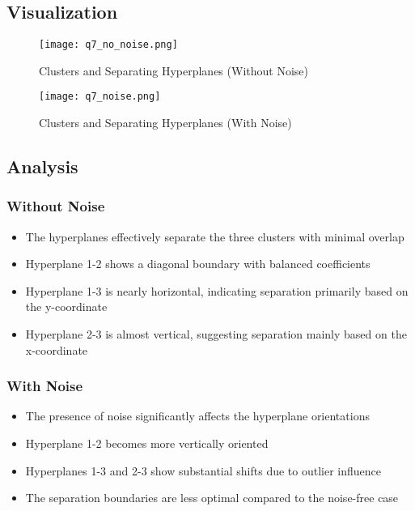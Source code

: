\documentclass[12pt]{article}
\begin{document}
\subsection{Visualization}
\begin{figure}[H]
    \centering
    \texttt{[image: q7\_no\_noise.png]}
    \caption{Clusters and Separating Hyperplanes (Without Noise)}
\end{figure}
\begin{figure}[H]
    \centering
    \texttt{[image: q7\_noise.png]}
    \caption{Clusters and Separating Hyperplanes (With Noise)}
\end{figure}

\subsection{Analysis}

\subsubsection{Without Noise}
\begin{itemize}
    \item The hyperplanes effectively separate the three clusters with minimal overlap
    \item Hyperplane 1-2 shows a diagonal boundary with balanced coefficients
    \item Hyperplane 1-3 is nearly horizontal, indicating separation primarily based on the y-coordinate
    \item Hyperplane 2-3 is almost vertical, suggesting separation mainly based on the x-coordinate
\end{itemize}

\subsubsection{With Noise}
\begin{itemize}
    \item The presence of noise significantly affects the hyperplane orientations
    \item Hyperplane 1-2 becomes more vertically oriented
    \item Hyperplanes 1-3 and 2-3 show substantial shifts due to outlier influence
    \item The separation boundaries are less optimal compared to the noise-free case
\end{itemize}
\end{document}
